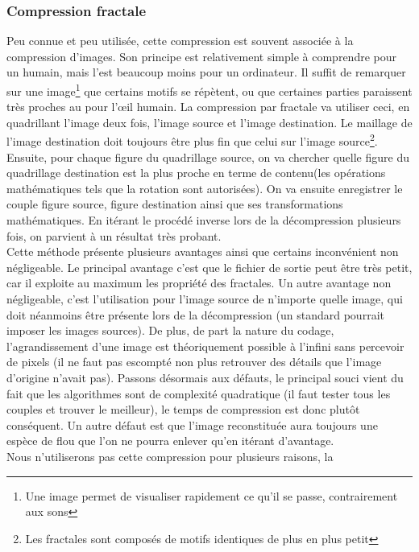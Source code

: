 \documentclass[a4paper,12pt]{article}
\begin{document}
		\subsubsection{Compression fractale}
Peu connue et peu utilisée,  cette compression est souvent associée à la
compression d'images.  Son principe est relativement simple à comprendre
pour un humain, mais l'est beaucoup moins pour un ordinateur.  Il suffit
de  remarquer  sur une  image\footnote{Une  image  permet  de visualiser
rapidement ce  qu'il  se  passe,  contrairement  aux  sons} que certains
motifs se répètent,  ou que certaines parties paraissent très proches au
pour l'œil  humain.  La compression par fractale  va utiliser ceci,  en
quadrillant l'image  deux fois,  l'image source  et l'image destination.
Le maillage de l'image destination doit toujours être plus fin que celui
sur  l'image  source\footnote{Les  fractales  sont  composés  de  motifs
identiques de  plus  en  plus  petit}.  Ensuite,  pour  chaque figure du
quadrillage  source,   on  va  chercher  quelle  figure  du  quadrillage
destination  est  la plus  proche  en  terme  de  contenu(les opérations
mathématiques tels  que  la  rotation  sont  autorisées).  On va ensuite
enregistrer le  couple figure source,  figure destination  ainsi que ses
transformations mathématiques.  En itérant le procédé inverse lors de la
décompression plusieurs fois, on parvient à un résultat très probant.\\
Cette  méthode   présente   plusieurs   avantages   ainsi  que  certains
inconvénient  non  négligeable.  Le  principal  avantage  c'est  que  le
fichier de sortie peut être très  petit,  car il exploite au maximum les
propriété  des  fractales.  Un  autre  avantage  non négligeable,  c'est
l'utilisation pour  l'image source de n'importe  quelle image,  qui doit
néanmoins être présente  lors de la décompression  (un standard pourrait
imposer les  images sources).  De  plus,  de part  la nature  du codage,
l'agrandissement d'une image est  théoriquement possible à l'infini sans
percevoir de  pixels (il  ne faut  pas escompté  non plus  retrouver des
détails  que  l'image  d'origine  n'avait  pas).  Passons  désormais aux
défauts,  le principal souci  vient du fait que les  algorithmes sont de
complexité quadratique  (il faut tester  tous les couples  et trouver le
meilleur), le temps de compression est donc plutôt conséquent.  Un autre
défaut est que l'image reconstituée aura toujours une espèce de flou que
l'on ne pourra enlever qu'en itérant d'avantage.\\
Nous n'utiliserons  pas  cette  compression  pour plusieurs raisons,  la
\end{document}
